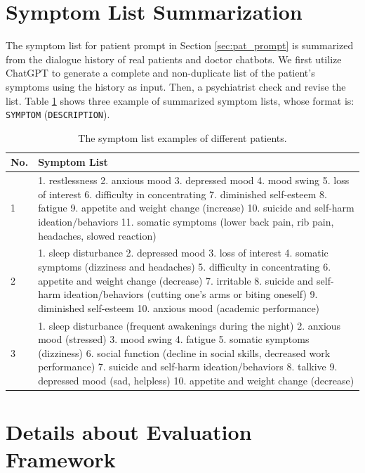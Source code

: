 \section{Symptom List Summarization}
\label{apd:symp_list}

The symptom list for patient prompt in Section \ref{sec:pat_prompt} is summarized from the dialogue history of real patients and doctor chatbots. We first utilize ChatGPT to generate a complete and non-duplicate list of the patient's symptoms using the history as input. Then, a psychiatrist check and revise the list. Table \ref{tab:symp_list} shows three example of summarized symptom lists, whose format is: \texttt{SYMPTOM} (\texttt{DESCRIPTION}).

\begin{table}[th]
    \footnotesize
    \centering
    \begin{tabular}{ m{} | m{} }
    \hline
    No. & Symptom List \\
    \hline
    1 & 1. restlessness 2. anxious mood 3. depressed mood 4. mood swing 5. loss of interest 6. difficulty in concentrating 7. diminished self-esteem  8. fatigue 9. appetite and weight change (increase) 10. suicide and self-harm ideation/behaviors 11. somatic symptoms (lower back pain, rib pain, headaches, slowed reaction) \\
    \hline
    2 & 1. sleep disturbance 2. depressed mood 3. loss of interest 4.  somatic symptoms (dizziness and headaches) 5. difficulty in concentrating 6. appetite and weight change (decrease) 7. irritable 8. suicide and self-harm ideation/behaviors (cutting one's arms or biting oneself) 9. diminished self-esteem 10. anxious mood (academic performance) \\
    \hline
    3 & 1. sleep disturbance (frequent awakenings during the night) 2. anxious mood (stressed) 3. mood swing 4. fatigue 5. somatic symptoms (dizziness) 6. social function (decline in social skills, decreased work performance) 7. suicide and self-harm ideation/behaviors 8. talkive 9. depressed mood (sad, helpless) 10. appetite and weight change (decrease) \\   
    \hline
    \end{tabular}
    \caption{The symptom list examples of different patients.}
    \label{tab:symp_list}
\end{table}

\section{Details about Evaluation Framework}

